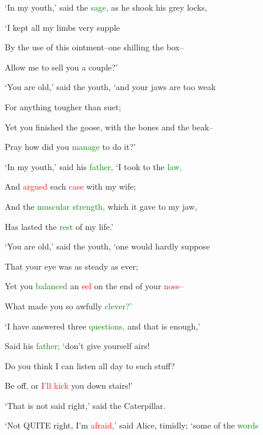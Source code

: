  ‘In my \textcolor{BurntOrange}{youth,’} said the \textcolor{green}{sage,} as he shook his grey locks,

 ‘I kept all my limbs very supple

 By the use of this ointment--one shilling the box--

 Allow me to sell you a couple?’



 ‘You are old,’ said the \textcolor{BurntOrange}{youth,} ‘and your jaws are too weak

 For anything tougher than suet;

 Yet you finished the goose, with the bones and the beak--

 \textcolor{BurntOrange}{Pray} how did you \textcolor{green}{manage} to do it?’



 ‘In my \textcolor{BurntOrange}{youth,’} said his \textcolor{green}{father,} ‘I took to the \textcolor{green}{law,}

 And \textcolor{red}{argued} each \textcolor{red}{case} with my wife;

 And the \textcolor{green}{muscular} \textcolor{green}{strength,} which it gave to my jaw,

 Has lasted the \textcolor{green}{rest} of my life.’



 ‘You are old,’ said the \textcolor{BurntOrange}{youth,} ‘one would hardly suppose

 That your eye was as \textcolor{BurntOrange}{steady} as ever;

 Yet you \textcolor{green}{balanced} an \textcolor{red}{eel} on the end of your \textcolor{red}{nose--}

 What made you so awfully \textcolor{green}{clever?’}



 ‘I have answered three \textcolor{green}{questions,} and that is enough,’

 Said his \textcolor{green}{father;} ‘don’t give yourself airs!

 Do you think I can listen all day to such stuff?

 Be off, or \textcolor{red}{I’ll} \textcolor{red}{kick} you down stairs!’





 ‘That is not said right,’ said the Caterpillar.



 ‘Not QUITE right, I’m \textcolor{red}{afraid,’} said Alice, timidly; ‘some of the \textcolor{green}{words}

